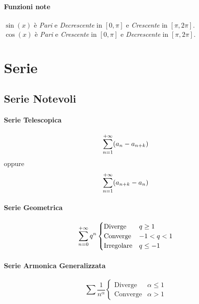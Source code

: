 \documentclass[12pt, a4paper]{article}
\begin{document}
\paragraph*{Funzioni note}
$\sin(x)$ è \emph{Pari} e \emph{Decrescente} in $[0,\pi]$ e \emph{Crescente} in $[\pi,2\pi]$.
\\$\cos(x)$ è \emph{Pari} e \emph{Crescente} in $[0,\pi]$ e \emph{Decrescente} in $[\pi,2\pi]$.

	\section{Serie}


	\subsection*{Serie Notevoli}

	\paragraph*{Serie Telescopica}
	\begin{equation*}
		\sum_{n=1}^{+\infty} (a_n - a_{n+k})
	\end{equation*}
	oppure
	\begin{equation*}
		\sum_{n=1}^{+\infty} (a_{n+k} - a_n)
	\end{equation*}

	\paragraph*{Serie Geometrica}
	\begin{equation*}
		\sum_{n=0}^{+\infty} q^n \begin{cases}
			\text{Diverge}    & q\geq 1  \\
			\text{Converge}   & -1<q<1   \\
			\text{Irregolare} & q\leq -1
		\end{cases}
	\end{equation*}

	\paragraph*{Serie Armonica Generalizzata}
	\begin{equation*}
		\sum \frac{1}{n^\alpha} \begin{cases}
			\text{Diverge}  & \alpha\leq 1 \\
			\text{Converge} & \alpha> 1
		\end{cases}
	\end{equation*}
\end{document}
